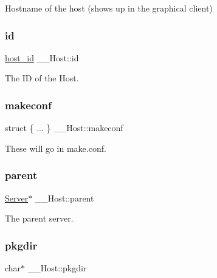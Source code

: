 Hostname of the host (shows up in the graphical client) 

\mbox{\label{struct_____host_a2101a62a3859aa1106a2722c659f93c6}} 
\subsubsection{\texorpdfstring{id}{id}}
{\footnotesize\ttfamily \mbox{\hyperlink{host_8h_ad9a5413d8b4376a70706368c97972c2b}{host\+\_\+id}} \+\_\+\+\_\+\+Host\+::id}



The ID of the Host. 

\mbox{\label{struct_____host_a5dbb399641e9722e0250871091751972}} 
\subsubsection{\texorpdfstring{makeconf}{makeconf}}
{\footnotesize\ttfamily struct \{ ... \}   \+\_\+\+\_\+\+Host\+::makeconf}



These will go in make.\+conf. 

\mbox{\label{struct_____host_ac050615c8d9d8da7d2cfaffaafd9473d}} 
\subsubsection{\texorpdfstring{parent}{parent}}
{\footnotesize\ttfamily \mbox{\hyperlink{server_8h_a705d964b8a67edeeb3943273a397e4c2}{Server}}$\ast$ \+\_\+\+\_\+\+Host\+::parent}



The parent server. 

\mbox{\label{struct_____host_af2be365c35b8cd256780212154c5e639}} 
\subsubsection{\texorpdfstring{pkgdir}{pkgdir}}
{\footnotesize\ttfamily char$\ast$ \+\_\+\+\_\+\+Host\+::pkgdir}



